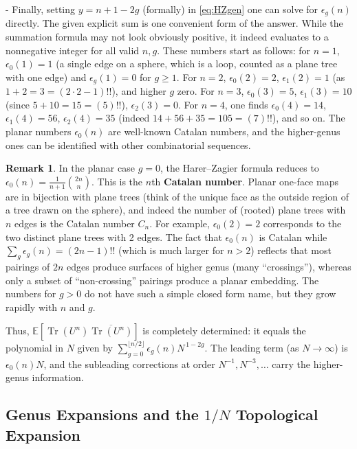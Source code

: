 \documentclass[letterpaper,11pt,oneside,reqno]{article}
\numberwithin{equation}{section}
\theoremstyle{definition}
\newtheorem{remark}[proposition]{Remark}
\begin{document}
- Finally, setting $y= n+1-2g$ (formally) in \eqref{eq:HZgen} one can solve for $\epsilon_g(n)$ directly. The given explicit sum is one convenient form of the answer. While the summation formula may not look obviously positive, it indeed evaluates to a nonnegative integer for all valid $n,g$. These numbers start as follows: for $n=1$, $\epsilon_0(1)=1$ (a single edge on a sphere, which is a loop, counted as a plane tree with one edge) and $\epsilon_g(1)=0$ for $g\ge 1$. For $n=2$, $\epsilon_0(2)=2$, $\epsilon_1(2)=1$ (as $1+2=3=(2\cdot2-1)!!$), and higher $g$ zero. For $n=3$, $\epsilon_0(3)=5$, $\epsilon_1(3)=10$ (since $5+10=15=(5)!!$), $\epsilon_2(3)=0$. For $n=4$, one finds $\epsilon_0(4)=14$, $\epsilon_1(4)=56$, $\epsilon_2(4)=35$ (indeed $14+56+35=105=(7)!!$), and so on. The planar numbers $\epsilon_0(n)$ are well-known Catalan numbers, and the higher-genus ones can be identified with other combinatorial sequences.

\begin{remark}
In the planar case $g=0$, the Harer–Zagier formula reduces to $\epsilon_0(n) = \frac{1}{n+1}\binom{2n}{n}$. This is the $n$th \textbf{Catalan number}. Planar one-face maps are in bijection with plane trees (think of the unique face as the outside region of a tree drawn on the sphere), and indeed the number of (rooted) plane trees with $n$ edges is the Catalan number $C_n$. For example, $\epsilon_0(2)=2$ corresponds to the two distinct plane trees with 2 edges. The fact that $\epsilon_0(n)$ is Catalan while $\sum_g \epsilon_g(n)=(2n-1)!!$ (which is much larger for $n>2$) reflects that most pairings of $2n$ edges produce surfaces of higher genus (many ``crossings''), whereas only a subset of ``non-crossing'' pairings produce a planar embedding. The numbers for $g>0$ do not have such a simple closed form name, but they grow rapidly with $n$ and $g$.
\end{remark}

Thus, $\mathbb{E}[\operatorname{Tr}(U^n)\overline{\operatorname{Tr}(U^n)}]$ is completely determined: it equals the polynomial in $N$ given by $\sum_{g=0}^{\lfloor n/2\rfloor}\epsilon_g(n) N^{\,1-2g}$. The leading term (as $N\to\infty$) is $\epsilon_0(n)N$, and the subleading corrections at order $N^{-1}, N^{-3},\dots$ carry the higher-genus information.

\subsection*{Genus Expansions and the $1/N$ Topological Expansion}
\end{document}

